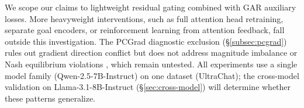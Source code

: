 We scope our claims to lightweight residual gating combined with GAR auxiliary losses. More heavyweight interventions, such as full attention head retraining, separate goal encoders, or reinforcement learning from attention feedback, fall outside this investigation. The PCGrad diagnostic exclusion (\S\ref{subsec:pcgrad}) rules out gradient direction conflict but does not address magnitude imbalance \citep{chen2018gradnorm} or Nash equilibrium violations \citep{navon2022nash}, which remain untested. All experiments use a single model family (Qwen-2.5-7B-Instruct) on one dataset (UltraChat); the cross-model validation on Llama-3.1-8B-Instruct (\S\ref{sec:cross-model}) will determine whether these patterns generalize.